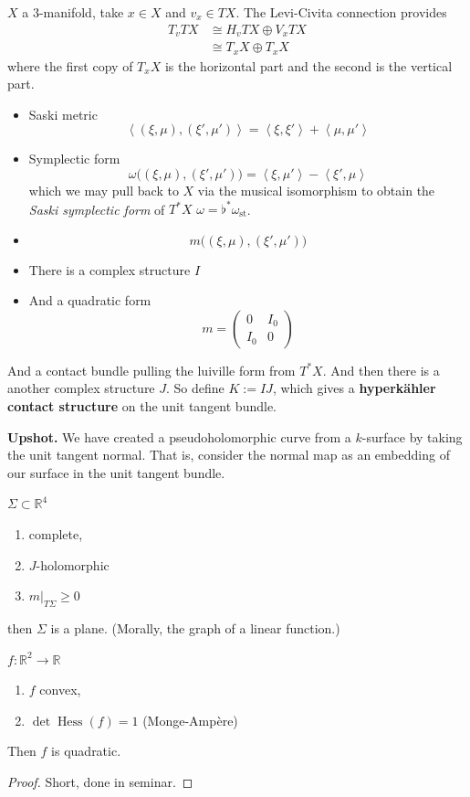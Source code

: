 $X$ a 3-manifold, take $x \in X$ and $v_x \in
TX$. The Levi-Civita connection provides
$$
\begin{aligned}
T_vTX &\cong H_vTX\oplus V_xTX \\
&\cong T_xX \oplus T_xX
\end{aligned}
$$
where the first copy of $T_xX$ is the
horizontal part and the second is the
vertical part.
\begin{itemize}
\item Saski metric
$$
\left\langle{} (\xi,\mu),(\xi',\mu')
\right\rangle{}=\left\langle{} \xi,\xi'
\right\rangle{}+\left\langle{} \mu,\mu'
\right\rangle{}
$$
\item Symplectic form
$$
\omega\Big((\xi,\mu),(\xi',\mu')\Big)=
\left\langle{}
\xi,\mu' \right\rangle{}-\left\langle{}
\xi',\mu \right\rangle{}
$$
which we may pull back to $X$ via the musical
isomorphism to obtain the \emph{Saski
symplectic form} of $T^*X$
$\omega=\flat^*\omega_{\operatorname{st}}$.
\item $$m\Big((\xi,\mu),(\xi',\mu')\Big)$$
\item There is a complex structure $I$
\item And a quadratic form
$$
m=\begin{pmatrix}0&I_0\\ I_0&0\end{pmatrix}
$$
\end{itemize}
And a contact bundle pulling the luiville
form from $T^*X$. And then there is a another
complex structure $J$. So define $K:=I J$,
which gives a {\bf hyperkähler contact
structure} on the unit tangent bundle.

\medskip\noindent
{\bf Upshot.}
We have created a pseudoholomorphic curve
from a $k$-surface by taking the unit tangent
normal. That is, consider the normal map as
an embedding of our surface in the unit
tangent bundle.

\begin{theorem}[Jurgens]
\label{theorem-smith-jurgens}
$\Sigma\subset\mathbb{R}^4$
\begin{enumerate}
\item[(i)] complete,
\item[(ii)] $J$-holomorphic
\item[(iii)] $m|_{T\Sigma}\geq 0$
\end{enumerate}
then $\Sigma$ is a plane. (Morally, the graph
of a linear function.)
\end{theorem}

\begin{theorem}
\label{theorem-smith-calabi-pogorelov}
$f:\mathbb{R}^2\to\mathbb{R}$
\begin{enumerate}
\item[(i)] $f$ convex,
\item[(ii)] $\det\operatorname{Hess}(f)=1$
(Monge-Ampère)
\end{enumerate}
Then $f$ is quadratic.

\begin{proof}
Short, done in seminar.
\end{proof}
\end{theorem}

